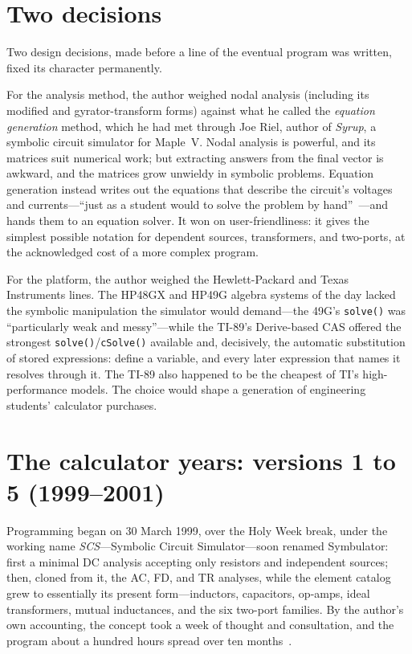 \documentclass[11pt,oneside]{report}
\newcommand{\code}[1]{\texttt{#1}}
\begin{document}
\section{Two decisions}

Two design decisions, made before a line of the eventual program was
written, fixed its character permanently.

For the analysis method, the author weighed nodal analysis (including
its modified and gyrator-transform forms) against what he called the
\emph{equation generation} method, which he had met through Joe Riel,
author of \emph{Syrup}, a symbolic circuit simulator for Maple~V.
Nodal analysis is powerful, and its matrices suit numerical work; but
extracting answers from the final vector is awkward, and the matrices
grow unwieldy in symbolic problems. Equation generation instead writes
out the equations that describe the circuit's voltages and
currents---``just as a student would to solve the problem by
hand''~\cite{website2001}---and hands them to an equation solver. It
won on user-friendliness: it gives the simplest possible notation for
dependent sources, transformers, and two-ports, at the acknowledged
cost of a more complex program.

For the platform, the author weighed the Hewlett-Packard and Texas
Instruments lines. The HP48GX and HP49G algebra systems of the day
lacked the symbolic manipulation the simulator would demand---the
49G's \code{solve()} was ``particularly weak and messy''---while the
TI-89's Derive-based CAS offered the strongest
\code{solve()}/\code{cSolve()} available and, decisively, the
automatic substitution of stored expressions: define a variable, and
every later expression that names it resolves through it. The TI-89
also happened to be the cheapest of TI's high-performance models. The
choice would shape a generation of engineering students' calculator
purchases.

\section{The calculator years: versions 1 to 5 (1999--2001)}

Programming began on 30 March 1999, over the Holy Week break, under
the working name \emph{SCS}---Symbolic Circuit Simulator---soon
renamed Symbulator: first a minimal DC analysis accepting only
resistors and independent sources; then, cloned from it, the AC, FD,
and TR analyses, while the element catalog grew to essentially its
present form---inductors, capacitors, op-amps, ideal transformers,
mutual inductances, and the six two-port families. By the author's
own accounting, the concept took a week of thought and consultation,
and the program about a hundred hours spread over ten
months~\cite{paper1999}.
\end{document}
